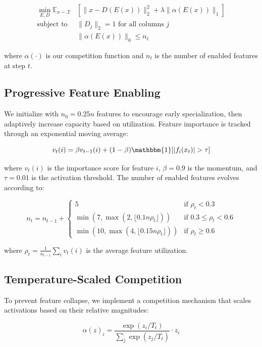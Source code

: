 \documentclass{article} %
\begin{document}
\begin{align}
    \min_{E,D} \mathbb{E}_{x \sim \mathcal{X}} &[\|x - D(E(x))\|_2^2 + \lambda\|\alpha(E(x))\|_1] \label{eq:method} \\
    \text{subject to } &\|D_j\|_2 = 1 \text{ for all columns } j \nonumber \\
    &\|\alpha(E(x))\|_0 \leq n_t \nonumber
\end{align}

where $\alpha(\cdot)$ is our competition function and $n_t$ is the number of enabled features at step $t$.

\subsection{Progressive Feature Enabling}
We initialize with $n_0 = 0.25n$ features to encourage early specialization, then adaptively increase capacity based on utilization. Feature importance is tracked through an exponential moving average:

\begin{equation}
    v_t(i) = \beta v_{t-1}(i) + (1-\beta)\mathbbm{1}[|f_i(x_t)| > \tau]
\end{equation}

where $v_t(i)$ is the importance score for feature $i$, $\beta=0.9$ is the momentum, and $\tau=0.01$ is the activation threshold. The number of enabled features evolves according to:

\begin{equation}
    n_t = n_{t-1} + \begin{cases}
        5 & \text{if } \rho_t < 0.3 \\
        \min(7, \max(2, \lfloor 0.1n \rho_t \rfloor)) & \text{if } 0.3 \leq \rho_t < 0.6 \\
        \min(10, \max(4, \lfloor 0.15n \rho_t \rfloor)) & \text{if } \rho_t \geq 0.6
    \end{cases}
\end{equation}

where $\rho_t = \frac{1}{n_{t-1}}\sum_i v_t(i)$ is the average feature utilization.

\subsection{Temperature-Scaled Competition}
To prevent feature collapse, we implement a competition mechanism that scales activations based on their relative magnitudes:

\begin{equation}
    \alpha(z)_i = \frac{\exp(z_i/T_t)}{\sum_j \exp(z_j/T_t)} \cdot z_i
\end{equation}
\end{document}
